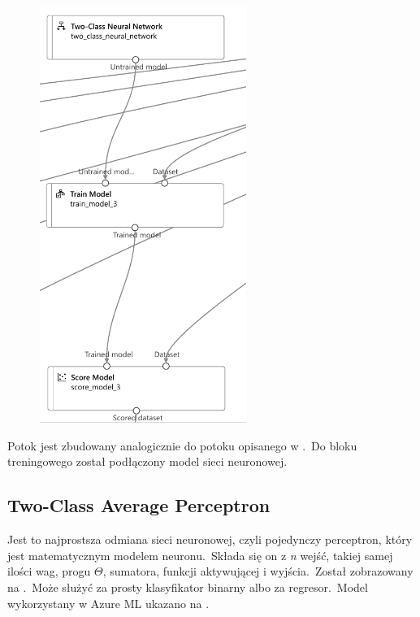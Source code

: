 \begin{figure}[H]
    \centering
    \includegraphics[width=0.6\textwidth]{images/nn_pipe}
    \label{fig:nn-pipe}
\end{figure}

Potok jest zbudowany analogicznie do potoku opisanego w .\ Do bloku treningowego został podłączony model sieci neuronowej.

\vfill
\pagebreak

\subsection{Two-Class Average Perceptron}
Jest to najprostsza odmiana sieci neuronowej, czyli pojedynczy perceptron, który jest matematycznym modelem neuronu.\ Składa się on z \textit{n} wejść, takiej samej ilości wag, progu $\Theta$, sumatora, funkcji aktywującej i wyjścia.\ Został zobrazowany na .\ Może służyć za prosty klasyfikator binarny albo za regresor.\ Model wykorzystany w Azure ML ukazano na .

